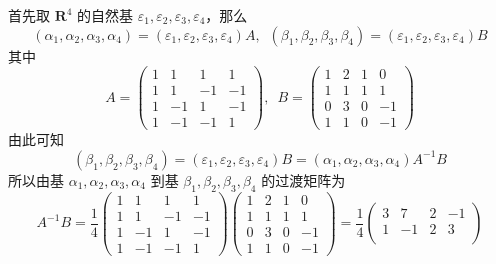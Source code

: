 \documentclass[UTF8,12pt,a4paper,fontset=fandol]{ctexart}
\begin{document}
\begin{solve}
首先取 $ \mathbf{R}^4 $ 的自然基 $\varepsilon_1, \varepsilon_2, \varepsilon_3, \varepsilon_4$，那么
            \[ (\alpha_1, \alpha_2, \alpha_3, \alpha_4) = (\varepsilon_1, \varepsilon_2, \varepsilon_3, \varepsilon_4) A,\enspace (\beta_1, \beta_2, \beta_3, \beta_4) = (\varepsilon_1, \varepsilon_2, \varepsilon_3, \varepsilon_4) B \]
            其中
            \[ A = \begin{pmatrix}
                    1 & 1  & 1  & 1  \\
                    1 & 1  & -1 & -1 \\
                    1 & -1 & 1  & -1 \\
                    1 & -1 & -1 & 1
                \end{pmatrix},\enspace B = \begin{pmatrix}
                    1 & 2 & 1 & 0  \\
                    1 & 1 & 1 & 1  \\
                    0 & 3 & 0 & -1 \\
                    1 & 1 & 0 & -1
                \end{pmatrix} \]
            由此可知
            \[ (\beta_1, \beta_2, \beta_3, \beta_4) = (\varepsilon_1, \varepsilon_2, \varepsilon_3, \varepsilon_4) B = (\alpha_1, \alpha_2, \alpha_3, \alpha_4) A^{-1} B \]
            所以由基 $ \alpha_1, \alpha_2, \alpha_3, \alpha_4 $ 到基 $ \beta_1, \beta_2, \beta_3, \beta_4 $ 的过渡矩阵为
            \[ A^{-1} B = \dfrac{1}{4} \begin{pmatrix}
                    1 & 1  & 1  & 1  \\
                    1 & 1  & -1 & -1 \\
                    1 & -1 & 1  & -1 \\
                    1 & -1 & -1 & 1
                \end{pmatrix} \begin{pmatrix}
                    1 & 2 & 1 & 0  \\
                    1 & 1 & 1 & 1  \\
                    0 & 3 & 0 & -1 \\
                    1 & 1 & 0 & -1
                \end{pmatrix} = \dfrac{1}{4} \begin{pmatrix}
                    3  & 7  & 2 & -1 \\
                    1  & -1 & 2 & 3  \\

\end{pmatrix}\]
\end{solve}
\end{document}
